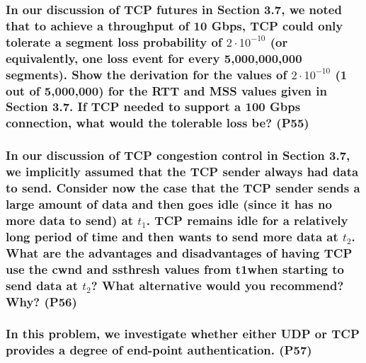 \subsubsection{In our discussion of TCP futures in Section 3.7, we noted that to achieve a throughput of 10 Gbps, TCP could only tolerate a segment loss probability of $2 \cdot 10^{-10}$ (or equivalently, one loss event for every 5,000,000,000 segments). Show the derivation for the values of $2 \cdot 10^{-10}$ (1 out of 5,000,000) for the RTT and MSS values given in Section 3.7. If TCP needed to support a  100 Gbps connection, what would the tolerable loss be? (P55)}


\subsubsection{In our discussion of TCP congestion control in Section 3.7, we implicitly assumed that the TCP sender always had data to send. Consider now the case that the TCP sender sends a large amount of data and then goes idle (since it has no more data to send) at $t_1$. TCP remains idle for a relatively long period of time and then wants to send more data at $t_2$. What are the advantages and disadvantages of having TCP use the cwnd and ssthresh values from t1when starting to send data at $t_2$? What alternative would you recommend? Why? (P56)}


\subsubsection{In this problem, we investigate whether either UDP or TCP provides a degree of end-point authentication. (P57)}

